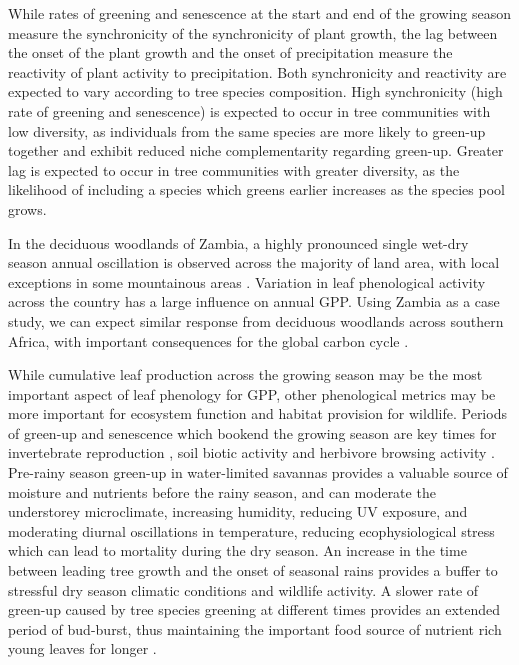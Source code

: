 \documentclass[11pt,a4paper]{article}
\begin{document}
While rates of greening and senescence at the start and end of the growing season measure the synchronicity of the synchronicity of plant growth, the lag between the onset of the plant growth and the onset of precipitation measure the reactivity of plant activity to precipitation. Both synchronicity and reactivity are expected to vary according to tree species composition. High synchronicity (high rate of greening and senescence) is expected to occur in tree communities with low diversity, as individuals from the same species are more likely to green-up together and exhibit reduced niche complementarity regarding green-up. Greater lag is expected to occur in tree communities with greater diversity, as the likelihood of including a species which greens earlier increases as the species pool grows.

In the deciduous woodlands of Zambia, a highly pronounced single wet-dry season annual oscillation is observed across the majority of land area, with local exceptions in some mountainous areas \citep{}. Variation in leaf phenological activity across the country has a large influence on annual GPP. Using Zambia as a case study, we can expect similar response from deciduous woodlands across southern Africa, with important consequences for the global carbon cycle \citep{}. 

While cumulative leaf production across the growing season may be the most important aspect of leaf phenology for GPP, other phenological metrics may be more important for ecosystem function and habitat provision for wildlife. Periods of green-up and senescence which bookend the growing season are key times for invertebrate reproduction \citep{}, soil biotic activity \citep{} and herbivore browsing activity \citep{}. Pre-rainy season green-up in water-limited savannas provides a valuable source of moisture and nutrients before the rainy season, and can moderate the understorey microclimate, increasing humidity, reducing UV exposure, and moderating diurnal oscillations in temperature, reducing ecophysiological stress which can lead to mortality during the dry season. An increase in the time between leading tree growth and the onset of seasonal rains provides a buffer to stressful dry season climatic conditions and wildlife activity. A slower rate of green-up caused by tree species greening at different times provides an extended period of bud-burst, thus maintaining the important food source of nutrient rich young leaves for longer \citep{}. 
 
\end{document}
